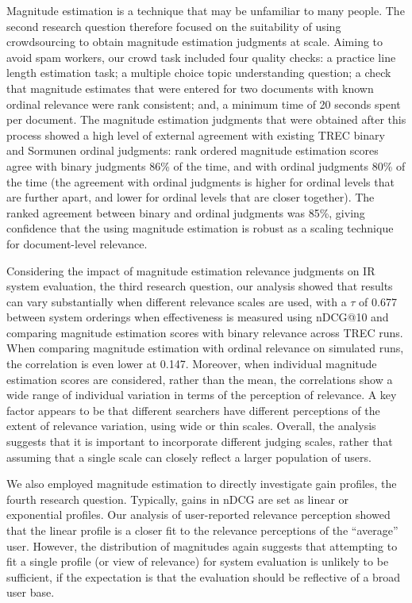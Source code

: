 Magnitude estimation is a technique that may be unfamiliar to many
people.
The second research question therefore focused on the suitability of
using crowdsourcing to obtain magnitude estimation judgments at scale.
Aiming to avoid spam workers, our crowd task included four quality
checks: a practice line length estimation task; a multiple choice topic
understanding question; a check that magnitude estimates that were
entered for two documents with known ordinal relevance were rank
consistent; and, a minimum time of 20 seconds spent per document.
The magnitude estimation judgments that were obtained after this
process showed a high level of external agreement with existing TREC
binary and Sormunen ordinal judgments: rank ordered magnitude
estimation scores agree with binary judgments 86\% of the time, and
with ordinal judgments 80\% of the time (the agreement with ordinal
judgments is higher for ordinal levels that are further apart, and
lower for ordinal levels that are closer together).
The ranked agreement between binary and ordinal judgments was 85\%,
giving confidence that the using magnitude estimation is robust as a
scaling technique for document-level relevance.

Considering the impact of magnitude estimation relevance judgments on
IR system evaluation, the third research question, our analysis showed
that results can vary substantially when different relevance scales are
used, with a $\tau$ of 0.677 between system orderings when
effectiveness is measured using nDCG@10 and comparing magnitude
estimation scores with binary relevance across TREC runs.
When comparing magnitude estimation with ordinal relevance on simulated
runs, the correlation is even lower at 0.147.
Moreover, when individual magnitude estimation scores are considered,
rather than the mean, the correlations show a wide range of individual
variation in terms of the perception of relevance.
A key factor appears to be that different searchers have different
perceptions of the extent of relevance variation, using wide or thin
scales.
Overall, the analysis suggests that it is important to incorporate
different judging scales, rather that assuming that a single scale can
closely reflect a larger population of users.

We also employed magnitude estimation to directly investigate gain
profiles, the fourth research question.
Typically, gains in nDCG are set as linear or exponential profiles.
Our analysis of user-reported relevance perception showed that the
linear profile is a closer fit to the relevance perceptions of the
``average'' user.
However, the distribution of magnitudes again suggests that attempting
to fit a single profile (or view of relevance) for system evaluation is
unlikely to be sufficient, if the expectation is that the evaluation
should be reflective of a broad user base.

